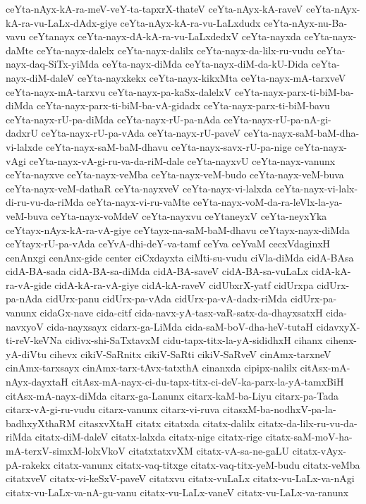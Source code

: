 {ceYta-nAyx-kA-ra-meV-veY-ta-tapxrX-thateV
ceYta-nAyx-kA-raveV
ceYta-nAyx-kA-ra-vu-LaLx-dAdx-giye
ceYta-nAyx-kA-ra-vu-LaLxdudx
ceYta-nAyx-nu-Ba-vavu
ceYtanayx
ceYta-nayx-dA-kA-ra-vu-LaLxdedxV
ceYta-nayxda
ceYta-nayx-daMte
ceYta-nayx-dalelx
ceYta-nayx-dalilx
ceYta-nayx-da-lilx-ru-vudu
ceYta-nayx-daq-SiTx-yiMda
ceYta-nayx-diMda
ceYta-nayx-diM-da-kU-Dida
ceYta-nayx-diM-daleV
ceYta-nayxkekx
ceYta-nayx-kikxMta
ceYta-nayx-mA-tarxveV
ceYta-nayx-mA-tarxvu
ceYta-nayx-pa-kaSx-dalelxV
ceYta-nayx-parx-ti-biM-ba-diMda
ceYta-nayx-parx-ti-biM-ba-vA-gidadx
ceYta-nayx-parx-ti-biM-bavu
ceYta-nayx-rU-pa-diMda
ceYta-nayx-rU-pa-nAda
ceYta-nayx-rU-pa-nA-gi-dadxrU
ceYta-nayx-rU-pa-vAda
ceYta-nayx-rU-paveV
ceYta-nayx-saM-baM-dha-vi-lalxde
ceYta-nayx-saM-baM-dhavu
ceYta-nayx-savx-rU-pa-nige
ceYta-nayx-vAgi
ceYta-nayx-vA-gi-ru-va-da-riM-dale
ceYta-nayxvU
ceYta-nayx-vanunx
ceYta-nayxve
ceYta-nayx-veMba
ceYta-nayx-veM-budo
ceYta-nayx-veM-buva
ceYta-nayx-veM-dathaR
ceYta-nayxveV
ceYta-nayx-vi-lalxda
ceYta-nayx-vi-lalx-di-ru-vu-da-riMda
ceYta-nayx-vi-ru-vaMte
ceYta-nayx-voM-da-ra-leVlx-la-ya-veM-buva
ceYta-nayx-voMdeV
ceYta-nayxvu
ceYtaneyxV
ceYta-neyxYka
ceYtayx-nAyx-kA-ra-vA-giye
ceYtayx-na-saM-baM-dhavu
ceYtayx-nayx-diMda
ceYtayx-rU-pa-vAda
ceYvA-dhi-deY-va-tamf
ceYva
ceYvaM
cecxVdaginxH
cenAnxgi
cenAnx-gide
center
ciCxdayxta
ciMti-su-vudu
ciVla-diMda
cidA-BAsa
cidA-BA-sada
cidA-BA-sa-diMda
cidA-BA-saveV
cidA-BA-sa-vuLaLx
cidA-kA-ra-vA-gide
cidA-kA-ra-vA-giye
cidA-kA-raveV
cidUbxrX-yatf
cidUrxpa
cidUrx-pa-nAda
cidUrx-panu
cidUrx-pa-vAda
cidUrx-pa-vA-dadx-riMda
cidUrx-pa-vanunx
cidaGx-nave
cida-citf
cida-navx-yA-tasx-vaR-satx-da-dhayxsatxH
cida-navxyoV
cida-nayxsayx
cidarx-ga-LiMda
cida-saM-boV-dha-heV-tutaH
cidavxyX-ti-reV-keVNa
cidivx-shi-SaTxtavxM
cidu-tapx-titx-la-yA-sididhxH
cihanx
cihenx-yA-diVtu
cihevx
cikiV-SaRnitx
cikiV-SaRti
cikiV-SaRveV
cinAmx-tarxneV
cinAmx-tarxsayx
cinAmx-tarx-tAvx-tatxthA
cinanxda
cipipx-nalilx
citAsx-mA-nAyx-dayxtaH
citAsx-mA-nayx-ci-du-tapx-titx-ci-deV-ka-parx-la-yA-tamxBiH
citAsx-mA-nayx-diMda
citarx-ga-Lanunx
citarx-kaM-ba-Liyu
citarx-pa-Tada
citarx-vA-gi-ru-vudu
citarx-vanunx
citarx-vi-ruva
citasxM-ba-nodhxV-pa-la-badhxyXthaRM
citasxvXtaH
citatx
citatxda
citatx-dalilx
citatx-da-lilx-ru-vu-da-riMda
citatx-diM-daleV
citatx-lalxda
citatx-nige
citatx-rige
citatx-saM-moV-ha-mA-terxV-simxM-lolxVkoV
citatxtatxvXM
citatx-vA-sa-ne-gaLU
citatx-vAyx-pA-rakekx
citatx-vanunx
citatx-vaq-titxge
citatx-vaq-titx-yeM-budu
citatx-veMba
citatxveV
citatx-vi-keSxV-paveV
citatxvu
citatx-vuLaLx
citatx-vu-LaLx-va-nAgi
citatx-vu-LaLx-va-nA-gu-vanu
citatx-vu-LaLx-vaneV
citatx-vu-LaLx-va-ranunx
}
